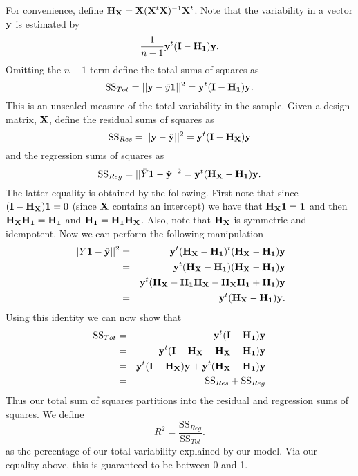 For convenience, define $\mathbf{H}_{\mathbf{X}}= \mathbf{X} (\mathbf{X}^t \mathbf{X})^{-1} \mathbf{X}^t$. Note that
the variability in a vector $\mathbf{y}$ is estimated by 
$$
\frac{1}{n-1} \mathbf{y}^t (\mathbf{I} - \mathbf{H}_{\mathbf{1}}) \mathbf{y}.
$$
Omitting the $n-1$ term define the total sums of squares as
$$
\mbox{SS}_{Tot} = ||\mathbf{y} - \bar y \mathbf{1} ||^2 = \mathbf{y}^t (\mathbf{I} - \mathbf{H}_{\mathbf{1}}) \mathbf{y}.
$$
This is an unscaled measure of the total variability in the
sample. Given a design matrix, $\mathbf{X}$, define the residual 
sums of squares as
$$
\mbox{SS}_{Res} = ||\mathbf{y} - \hat {\mathbf{y}}||^2 = \mathbf{y}^t (\mathbf{I} - \mathbf{H}_{\mathbf{X}}) \mathbf{y}
$$
and the regression sums of squares as 
$$
\mbox{SS}_{Reg} = ||\bar Y \mathbf{1} - \hat {\mathbf{y}}||^2 = \mathbf{y}^t (\mathbf{H}_{\mathbf{X}} - \mathbf{H}_{\mathbf{1}}) \mathbf{y}.
$$
The latter equality is obtained by the following. First note that since
$(\mathbf{I} - \mathbf{H}_{\mathbf{X}})\mathbf{1} = 0$ (since $\mathbf{X}$ contains an intercept) we have that
$\mathbf{H}_{\mathbf{X}} \mathbf{1} = \mathbf{1}$ and then $\mathbf{H}_{\mathbf{X}} \mathbf{H}_{\mathbf{1}} = \mathbf{H}_{\mathbf{1}}$
and $\mathbf{H}_{\mathbf{1}} = \mathbf{H}_{\mathbf{1}} \mathbf{H}_{\mathbf{X}}$.
Also, note that $\mathbf{H}_{\mathbf{X}}$ is symmetric and idempotent. 
Now we can perform the following manipulation
\begin{eqnarray*}
||\bar Y \mathbf{1} - \hat {\mathbf{y}}||^2 & = & 
\mathbf{y}^t (\mathbf{H}_{\mathbf{X}} - \mathbf{H}_{\mathbf{1}})^t (\mathbf{H}_{\mathbf{X}} - \mathbf{H}_{\mathbf{1}})\mathbf{y} \\
& = & \mathbf{y}^t (\mathbf{H}_{\mathbf{X}} - \mathbf{H}_{\mathbf{1}}) (\mathbf{H}_{\mathbf{X}} - \mathbf{H}_{\mathbf{1}})\mathbf{y} \\ 
& = & \mathbf{y}^t (\mathbf{H}_{\mathbf{X}} - \mathbf{H}_{\mathbf{1}}\mathbf{H}_{\mathbf{X}} - \mathbf{H}_{\mathbf{X}} \mathbf{H}_{\mathbf{1}} + \mathbf{H}_{\mathbf{1}}) \mathbf{y} \\
& = & \mathbf{y}^t (\mathbf{H}_{\mathbf{X}} - \mathbf{H}_{\mathbf{1}}) \mathbf{y}.
\end{eqnarray*}
Using this identity we can now show that
\begin{eqnarray*}
\mbox{SS}_{Tot} & = & \mathbf{y}^t (\mathbf{I} - \mathbf{H}_{\mathbf{1}}) \mathbf{y} \\
& = & \mathbf{y}^t (\mathbf{I} - \mathbf{H}_{\mathbf{X}} + \mathbf{H}_{\mathbf{X}} - \mathbf{H}_{\mathbf{1}}) \mathbf{y} \\
& = & \mathbf{y}^t (\mathbf{I} - \mathbf{H}_{\mathbf{X}}) \mathbf{y} + \mathbf{y}^t (\mathbf{H}_{\mathbf{X}} - \mathbf{H}_{\mathbf{1}}) \mathbf{y} \\
& = & \mbox{SS}_{Res} + \mbox{SS}_{Reg}
\end{eqnarray*}
Thus our total sum of squares partitions into the residual and regression sums of squares.
We define
$$
R^2 = \frac{\mbox{SS}_{Reg}}{\mbox{SS}_{Tot}}.
$$
as the percentage of our total variability explained by our model. Via our equality above,
this is guaranteed to be between 0 and 1. 